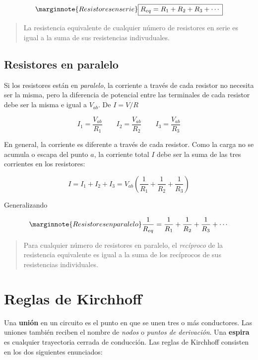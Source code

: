 \begin{equation}\label{26.1}\marginnote{Resistores en serie}
\boxed{R_{eq}=R_1+R_2+R_3+ \cdots}
\end{equation}

\begin{quote}
La resistencia equivalente de cualquier número de resistores en serie es igual a la suma de sus resistencias indivuduales.
\end{quote}

\subsection{Resistores en paralelo}
Si los resistores están en \textit{paralelo}, la corriente a través de cada resistor no necesita ser la misma, pero la diferencia de potencial entre las terminales de cada resistor debe ser la misma e igual a $V_{ab}$. De $I=V/R$

\begin{equation*}
I_1=\frac{V_{ab}}{R_1} \qquad I_2=\frac{V_{ab}}{R_2} \qquad I_3=\frac{V_{ab}}{R_3}
\end{equation*}

En general, la corriente es diferente a través de cada resistor. Como la carga no se acumula o escapa del punto $a$, la corriente total $I$ debe ser la suma de las tres corrientes en los resistores:

\begin{equation*}
I=I_1+I_2+I_3=V_{ab}\left(\frac{1}{R_1}+\frac{1}{R_2}+\frac{1}{R_3}\right)
\end{equation*}

Generalizando

\begin{equation}\label{26.2}\marginnote{Resistores en paralelo}
\frac{1}{R_{eq}}=\frac{1}{R_1}+\frac{1}{R_2}+\frac{1}{R_3}+\cdots
\end{equation}

\begin{quote}
Para cualquier número de resistores en paralelo, el \textit{recíproco} de la resistencia equivalente es igual a la suma de los recíprocos de sus resistencias individuales.
\end{quote}

\section{Reglas de Kirchhoff}
Una \textbf{unión} en un circuito es el punto en que se unen tres o más conductores. Las uniones también reciben el nombre de \textit{nodos} o \textit{puntos de derivación}. Una \textbf{espira} es cualquier trayectoria cerrada de conducción. Las reglas de Kirchhoff consisten en los dos siguientes enunciados:

